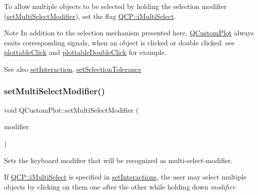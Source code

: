 To allow multiple objects to be selected by holding the selection modifier (\mbox{\hyperlink{class_q_custom_plot_a8fc96e3b5138a06759a2a90c166df516}{set\+Multi\+Select\+Modifier}}), set the flag \mbox{\hyperlink{namespace_q_c_p_a2ad6bb6281c7c2d593d4277b44c2b037aef673112c5067c3cf4cfddb62da7265d}{Q\+C\+P\+::i\+Multi\+Select}}.

\begin{DoxyNote}{Note}
In addition to the selection mechanism presented here, \mbox{\hyperlink{class_q_custom_plot}{Q\+Custom\+Plot}} always emits corresponding signals, when an object is clicked or double clicked. see \mbox{\hyperlink{class_q_custom_plot_a57e5efa8a854620e9bf62d31fc139f53}{plottable\+Click}} and \mbox{\hyperlink{class_q_custom_plot_af2e6f1cea923dae437681d01ce7d0c31}{plottable\+Double\+Click}} for example.
\end{DoxyNote}
\begin{DoxySeeAlso}{See also}
\mbox{\hyperlink{class_q_custom_plot_a422bf1bc6d56dac75a3d805d9a65902c}{set\+Interaction}}, \mbox{\hyperlink{class_q_custom_plot_a4dc31241d7b09680950e19e5f971ed93}{set\+Selection\+Tolerance}} 
\end{DoxySeeAlso}
\mbox{\label{class_q_custom_plot_a8fc96e3b5138a06759a2a90c166df516}} 
\subsubsection{\texorpdfstring{set\+Multi\+Select\+Modifier()}{setMultiSelectModifier()}}
{\footnotesize\ttfamily void Q\+Custom\+Plot\+::set\+Multi\+Select\+Modifier (\begin{DoxyParamCaption}\item[{Qt\+::\+Keyboard\+Modifier}]{modifier }\end{DoxyParamCaption})}

Sets the keyboard modifier that will be recognized as multi-\/select-\/modifier.

If \mbox{\hyperlink{namespace_q_c_p_a2ad6bb6281c7c2d593d4277b44c2b037aef673112c5067c3cf4cfddb62da7265d}{Q\+C\+P\+::i\+Multi\+Select}} is specified in \mbox{\hyperlink{class_q_custom_plot_a5ee1e2f6ae27419deca53e75907c27e5}{set\+Interactions}}, the user may select multiple objects by clicking on them one after the other while holding down {\itshape modifier}.


